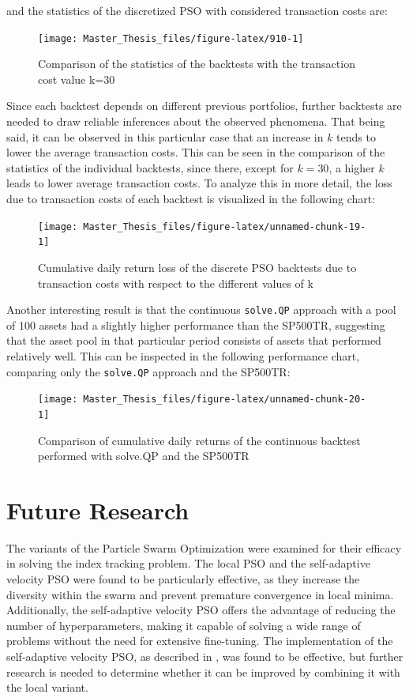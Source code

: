 \documentclass[
  oneside, a4paper, 12pt, openany]{book}
\theoremstyle{definition}
\theoremstyle{definition}
\theoremstyle{definition}
\theoremstyle{definition}
\theoremstyle{remark}
\begin{document}
and the statistics of the discretized PSO with considered transaction costs are:

\begin{figure}[H]
\texttt{[image: Master\_Thesis\_files/figure-latex/910-1]} \caption{Comparison of the statistics of the backtests with the transaction cost value k=30}\label{fig:910}
\end{figure}

Since each backtest depends on different previous portfolios, further backtests are needed to draw reliable inferences about the observed phenomena. That being said, it can be observed in this particular case that an increase in \(k\) tends to lower the average transaction costs. This can be seen in the comparison of the statistics of the individual backtests, since there, except for \(k=30\), a higher \(k\) leads to lower average transaction costs. To analyze this in more detail, the loss due to transaction costs of each backtest is visualized in the following chart:

\begin{figure}[H]
\texttt{[image: Master\_Thesis\_files/figure-latex/unnamed-chunk-19-1]} \caption{Cumulative daily return loss of the discrete PSO backtests due to transaction costs with respect to the different values of k}\label{fig:unnamed-chunk-19}
\end{figure}

Another interesting result is that the continuous \texttt{solve.QP} approach with a pool of 100 assets had a slightly higher performance than the SP500TR, suggesting that the asset pool in that particular period consists of assets that performed relatively well. This can be inspected in the following performance chart, comparing only the \texttt{solve.QP} approach and the SP500TR:

\begin{figure}[H]
\texttt{[image: Master\_Thesis\_files/figure-latex/unnamed-chunk-20-1]} \caption{Comparison of cumulative daily returns of the continuous backtest performed with solve.QP and the SP500TR}\label{fig:unnamed-chunk-20}
\end{figure}

\hypertarget{future-research}{%
\chapter{Future Research}\label{future-research}}

The variants of the Particle Swarm Optimization were examined for their efficacy in solving the index tracking problem. The local PSO and the self-adaptive velocity PSO were found to be particularly effective, as they increase the diversity within the swarm and prevent premature convergence in local minima. Additionally, the self-adaptive velocity PSO offers the advantage of reducing the number of hyperparameters, making it capable of solving a wide range of problems without the need for extensive fine-tuning. The implementation of the self-adaptive velocity PSO, as described in \citep{FaYa2014}, was found to be effective, but further research is needed to determine whether it can be improved by combining it with the local variant.
\end{document}
